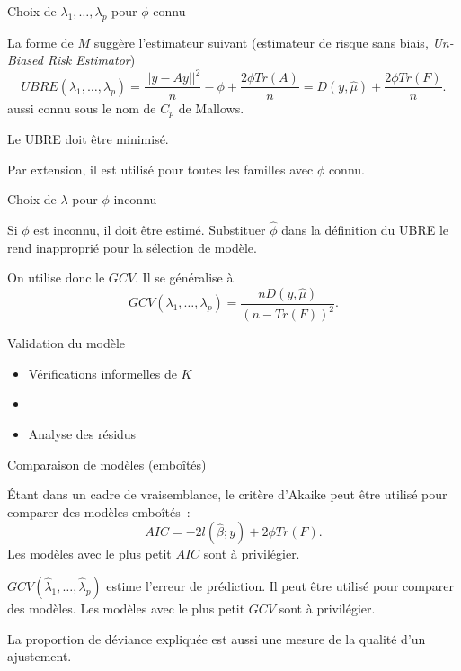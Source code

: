 \documentclass{BeamerTemplate}
\begin{document}
\begin{refsection}
\begin{frame}{Choix de $\lambda_1,\ldots,\lambda_p$ pour $\phi$ connu}
\end{frame}


\begin{frame}{}
La forme de $M$ suggère l'estimateur suivant (estimateur de risque sans biais, \textit{Un-Biased Risk Estimator})
$$ UBRE(\lambda_1,\ldots,\lambda_p) = \frac{ \left|\left| y - Ay  \right|\right|^2}{n}   - \phi + \frac{2 \phi Tr(A)}{n} = D(y,\hat{\mu}) + \frac{2 \phi Tr(F)}{n}.$$
aussi connu sous le nom de $C_p$ de Mallows.

\bigskip 
Le UBRE doit être minimisé.

\bigskip
Par extension, il est utilisé pour toutes les familles avec $\phi$ connu.
\end{frame}

\begin{frame}{Choix de $\lambda$ pour $\phi$ inconnu}

Si $\phi$ est inconnu, il doit être estimé. Substituer $\hat{\phi}$ dans la définition du UBRE le rend inapproprié pour la sélection de modèle.

\bigskip
On utilise donc le $GCV$. Il se généralise à 
$$ GCV(\lambda_1, \ldots,\lambda_p) = \frac{n D(y,\hat{\mu})}{(n- Tr(F))^2}.$$
\end{frame}

\begin{frame}{Validation du modèle}

\begin{itemize}
\item Vérifications informelles de $K$  
\item[]
\item Analyse des résidus
\end{itemize}

\end{frame}

\begin{frame}{Comparaison de modèles (emboîtés)}

Étant dans un cadre de vraisemblance, le critère d'Akaike peut être utilisé pour comparer des modèles emboîtés~:
$$AIC = -2 l(\hat{\beta};y) + 2 \phi Tr(F).$$
Les modèles avec le plus petit $AIC$ sont à privilégier.

\bigskip
$GCV(\hat{\lambda}_1, \ldots,\hat{\lambda}_p)$ estime l'erreur de
prédiction. Il peut être utilisé pour comparer des modèles. Les modèles avec le plus petit $GCV$ sont à privilégier.

\bigskip
La proportion de déviance expliquée est aussi une mesure de la qualité d'un ajustement.


\end{frame}
\end{refsection}
\end{document}
